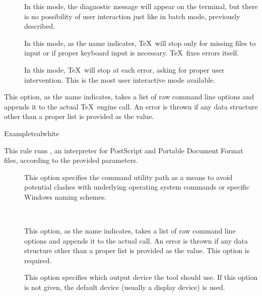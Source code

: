 \begin{description}
\begin{description}
\begin{description}
\item[] In this mode, the diagnostic message will appear on the terminal, but there is no possibility of user interaction just like in batch mode, previously described.

\item[] In this mode, as the name indicates, \TeX\ will stop only for missing files to input or if proper keyboard input is necessary. \TeX\ fixes errors itself.

\item[] In this mode, \TeX\ will stop at each error, asking for proper user intervention. This is the most user interactive mode available.
\end{description}

\item[\abox{options}] This option, as the name indicates, takes a list of raw command line options and appends it to the actual \TeX\ engine call. An error is thrown if any data structure other than a proper list is provided as the value.
\end{description}

\begin{codebox}{Example}{teal}{\icnote}{white}
\end{codebox}

\item[\rulebox{ghostscript}]
This rule runs , an interpreter for PostScript and Portable Document Format files, according to the provided parameters.

\begin{description}
\item[] This option specifies the command utility path as a means to avoid potential clashes with underlying operating system commands or specific Windows naming schemes.

\item[~\rqbox] This option, as the name indicates, takes a list of raw command line options and appends it to the actual  call. An error is thrown if any data structure other than a proper list is provided as the value. This option is required.

\item[] This option specifies which output device the tool should use. If this option is not given, the default device (usually a display device) is used.


\end{description}
\end{description}
